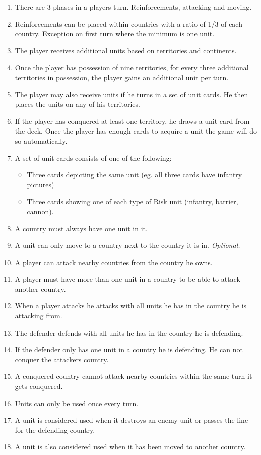 \documentclass[12pt,a4paper]{article}
\begin{document}
\begin{enumerate}
\item There are 3 phases in a players turn. Reinforcements, attacking
  and moving.
\item Reinforcements can be placed within countries with a ratio of
  1/3 of each country. Exception on first turn where the minimum is
  one unit.
\item The player receives additional units based on territories and
  continents.
\item Once the player has possession of nine territories, for every
  three additional territories in possession, the player gains an
  additional unit per turn.
\item The player may also receive units if he turns in a set of unit
  cards. He then places the units on any of his territories.
\item If the player has conquered at least one territory, he draws a
  unit card from the deck. Once the player has enough cards to acquire
  a unit the game will do so automatically.
\item A set of unit cards consists of one of the following:
  \begin{itemize}
  \item Three cards depicting the same unit (eg. all three cards have
    infantry pictures)
  \item Three cards showing one of each type of Risk unit (infantry,
    barrier, cannon).
  \end{itemize}
\item A country must always have one unit in it.
\item A unit can only move to a country next to the country it is
  in. \emph{Optional.}
\item A player can attack nearby countries from the country he owns.
\item A player must have more than one unit in a country to be able to
  attack another country.
\item When a player attacks he attacks with all units he has in the
  country he is attacking from.
\item The defender defends with all units he has in the country he is defending.
\item If the defender only has one unit in a country he is
  defending. He can not conquer the attackers country.
\item A conquered country cannot attack nearby countries within the
  same turn it gets conquered.
\item Units can only be used once every turn.
\item A unit is considered used when it destroys an enemy unit or
  passes the line for the defending country.
\item A unit is also considered used when it has been moved to another
  country.
\end{enumerate}
\end{document}
